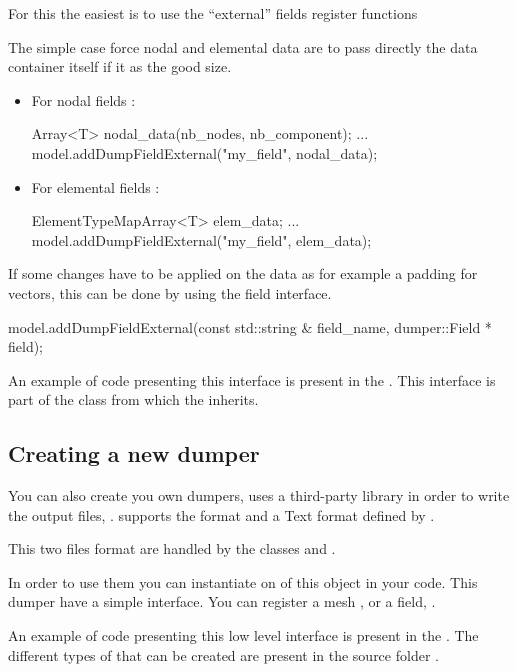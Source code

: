 For this the easiest is to use the ``external'' fields register functions

The simple case force nodal and elemental data are to pass directly the data
container itself if it as the good size.
\begin{itemize}
\item For nodal fields :
\begin{cpp}
  Array<T> nodal_data(nb_nodes, nb_component);
  ...
  model.addDumpFieldExternal("my_field", nodal_data);
\end{cpp}

\item For elemental fields :
\begin{cpp}
  ElementTypeMapArray<T> elem_data;
  ...
  model.addDumpFieldExternal("my_field", elem_data);
\end{cpp}
\end{itemize}

If some changes have to be applied on the data as for example a padding for
 vectors, this can be done by using the
field interface.

\begin{cpp}
  model.addDumpFieldExternal(const std::string & field_name,
                             dumper::Field * field);
\end{cpp}

An example of code presenting this interface is present in the
. This interface is part of the
 class from which the  inherits.

\subsection{Creating a new dumper}

You can also create you own dumpers, \akantu uses a third-party library in order
to write the output files, . \akantu supports the 
format and a Text format defined by .

This two files format are handled by the classes
 and
.

In order to use them you can instantiate on of this object in your code. This
dumper have a simple interface. You can register a mesh
,
 or a field,
.

An example of code presenting this low level interface is present in the
. The different types of  that can
be created are present in the source folder .

